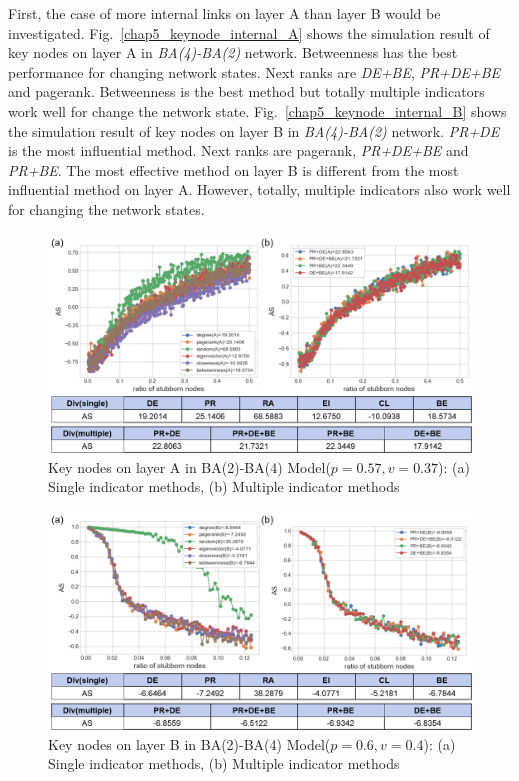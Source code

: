 First, the case of more internal links on layer A than layer B would be investigated. 
Fig.~\ref{chap5_keynode_internal_A} shows the simulation result of key nodes on layer A in \textit{BA(4)-BA(2)} network. Betweenness has the best performance for changing network states. Next ranks are \textit{DE+BE}, \textit{PR+DE+BE} and pagerank. Betweenness is the best method but totally multiple indicators work well for change the network state.  
Fig.~\ref{chap5_keynode_internal_B} shows the simulation result of key nodes on layer B in \textit{BA(4)-BA(2)} network. \textit{PR+DE} is the most influential method. Next ranks are pagerank, \textit{PR+DE+BE} and \textit{PR+BE}. The most effective method on layer B is different from the most influential method on layer A. However, totally, multiple indicators also work well for changing the network states.  
\begin{figure}[!htb]
	\centering
	\includegraphics[width=\hsize]{figure/chap5_keynode_internal_A2.png}
	\caption{Key nodes on layer A in BA(2)-BA(4) Model($p=0.57, v=0.37$):
		(a) Single indicator methods, (b) Multiple indicator methods}
	\label{chap5_keynode_internal_A2}
\end{figure}
\begin{figure}[!htb]
	\centering
	\includegraphics[width=\hsize]{figure/chap5_keynode_internal_B2.png}
	\caption{Key nodes on layer B in BA(2)-BA(4) Model($p=0.6, v=0.4$):
		(a) Single indicator methods, (b) Multiple indicator methods}
	\label{chap5_keynode_internal_B2}
\end{figure}
